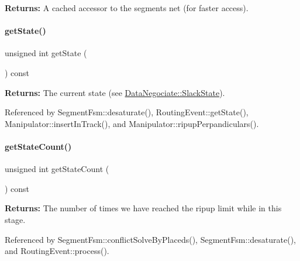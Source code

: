 {\bfseries Returns\+:} A cached accessor to the segment\textquotesingle{}s net (for faster access). \mbox{\label{classKite_1_1DataNegociate_a40ec2b23684a0e6e6d7ac9783a269037}} 
\paragraph{\texorpdfstring{get\+State()}{getState()}}
{\footnotesize\ttfamily unsigned int get\+State (\begin{DoxyParamCaption}{ }\end{DoxyParamCaption}) const\hspace{0.3cm}{\ttfamily [inline]}}

{\bfseries Returns\+:} The current state (see \hyperlink{classKite_1_1DataNegociate_ab7ccb6fc1f298728995250a3bbcf18c7}{Data\+Negociate\+::\+Slack\+State}). 

Referenced by Segment\+Fsm\+::desaturate(), Routing\+Event\+::get\+State(), Manipulator\+::insert\+In\+Track(), and Manipulator\+::ripup\+Perpandiculars().

\mbox{\label{classKite_1_1DataNegociate_a6ad2b700f668f8e2e5cd4fbc717d8765}} 
\paragraph{\texorpdfstring{get\+State\+Count()}{getStateCount()}}
{\footnotesize\ttfamily unsigned int get\+State\+Count (\begin{DoxyParamCaption}{ }\end{DoxyParamCaption}) const\hspace{0.3cm}{\ttfamily [inline]}}

{\bfseries Returns\+:} The number of times we have reached the ripup limit while in this stage. 

Referenced by Segment\+Fsm\+::conflict\+Solve\+By\+Placeds(), Segment\+Fsm\+::desaturate(), and Routing\+Event\+::process().

\mbox{\label{classKite_1_1DataNegociate_a9832198737bd835fab730ff2b95bbfa0}} 
